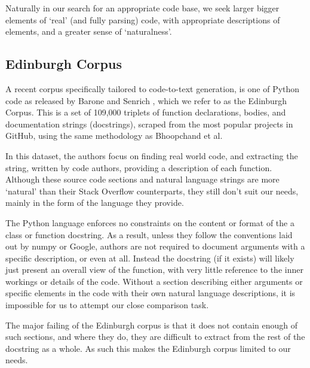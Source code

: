 Naturally in our search for an appropriate code base, we seek larger bigger elements of `real' (and fully parsing) code, with appropriate descriptions of elements, and a greater sense of `naturalness'.

\subsection{Edinburgh Corpus}

A recent corpus specifically tailored to code-to-text generation, is one of Python code as released by Barone and Senrich \cite{barone_parallel_2017}, which we refer to as the Edinburgh Corpus. 
This is a set of 109,000 triplets of function declarations, bodies, and documentation strings (docstrings), scraped from the most popular projects in GitHub, using the same methodology as Bhoopchand et al. 

In this dataset, the authors focus on finding real world code, and extracting the string, written by code authors, providing a description of each function.
Although these source code sections and natural language strings are more `natural' than their Stack Overflow counterparts, they still don't suit our needs, mainly in the form of the language they provide. 

The Python language enforces no constraints on the content or format of the a class or function docstring.
As a result, unless they follow the conventions laid out by numpy or Google, authors are not required to document arguments with a specific description, or even at all.
Instead the docstring (if it exists) will likely just present an overall view of the function, with very little reference to the inner workings or details of the code. 
Without a section describing either arguments or specific elements in the code with their own natural language descriptions, it is impossible for us to attempt our close comparison task.



The major failing of the Edinburgh corpus is that it does not contain enough of such sections, and where they do, they are difficult to extract from the rest of the docstring as a whole.
As such this makes the Edinburgh corpus limited to our needs.


